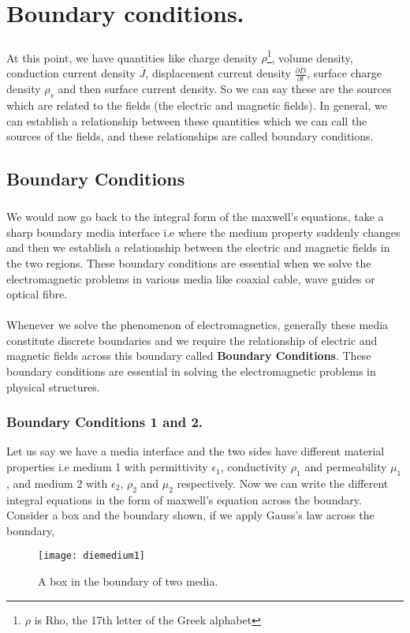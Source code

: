 \chapter{Boundary conditions.}
	\paragraph{}At this point, we have quantities like charge density $\rho$\footnote[1]{$\rho$ is Rho, the 17th letter of the Greek alphabet}, volume density, conduction current density $\overline{J}$, displacement current density $\frac{\partial \overline{D}}{\partial t}$, surface charge density $\rho_s$ and then surface current density. So we can say these are the sources which are related to the fields (the electric and magnetic fields). In general, we can establish a relationship between these quantities which we can call the sources of the fields, and these relationships are called boundary conditions.
	\section{Boundary Conditions}
	\paragraph{}We would now go back to the integral form of the maxwell's equations, take a sharp boundary media interface i.e where the medium property suddenly changes and then we establish a relationship between the electric and magnetic fields in the two regions. These boundary conditions are essential when we solve the electromagnetic problems in various media like coaxial cable, wave guides or optical fibre.\\ \\
	Whenever we solve the phenomenon of electromagnetics, generally these media constitute discrete boundaries and we require the relationship of electric and magnetic fields across this boundary called \textbf{Boundary Conditions}. These boundary conditions are essential in solving the electromagnetic problems in physical structures.
	\subsection{Boundary Conditions 1 and 2.}
	Let us say we have a media interface and the two sides have different material properties i.e medium 1 with permittivity $\epsilon_1$, conductivity $\rho_1$ and permeability $\mu_1$, and medium 2 with $\epsilon_2$, $\rho_2$ and $\mu_2$ respectively. Now we can write the different integral equations in the form of maxwell's equation across the boundary. Consider a box and the boundary shown, if we apply Gauss's law across the boundary,
	\begin{figure}[h]
		\centering
		\texttt{[image: diemedium1]}
		\caption{A box in the boundary of two media.}
	\end{figure}
	
